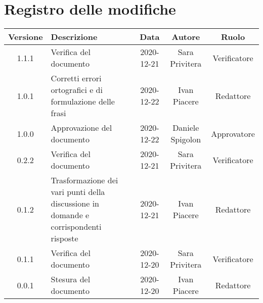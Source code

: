 \section*{Registro delle modifiche}

\begin{center}
	\begin{longtable}{|c|p{5cm}|c|c|c|}
	\hline
	\rowcolor{lighter-grayer}
	\textbf{Versione} & \textbf{Descrizione} & \textbf{Data} & \textbf{Autore} & \textbf{Ruolo} \\
	\hline
	\endfirsthead

	
	1.1.1 & Verifica del documento & 2020-12-21 & Sara Privitera & Verificatore \\
	\hline
	1.0.1 & Corretti errori ortografici e di formulazione delle frasi & 2020-12-22 & Ivan Piacere & Redattore \\
	\hline
	1.0.0 & Approvazione del documento & 2020-12-22 & Daniele Spigolon & Approvatore \\
	\hline
	0.2.2 & Verifica del documento & 2020-12-21 & Sara Privitera & Verificatore \\
	\hline
	0.1.2 & Trasformazione dei vari punti della discussione in domande e corrispondenti risposte & 2020-12-21 & Ivan Piacere & Redattore \\
	\hline
	0.1.1 & Verifica del documento & 2020-12-20 & Sara Privitera & Verificatore \\
	\hline
	0.0.1 & Stesura del documento & 2020-12-20 & Ivan Piacere & Redattore \\
	\hline
	\end{longtable}
\end{center}
